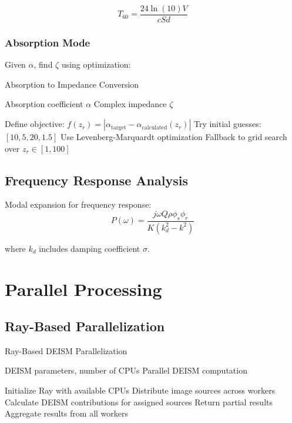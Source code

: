 \documentclass[11pt,a4paper]{article}
\begin{document}
\begin{equation}
T_{60} = \frac{24 \ln(10) V}{c S d}
\end{equation}

\subsubsection{Absorption Mode}
Given $\alpha$, find $\zeta$ using optimization:
\begin{algorithm}[H]
\caption{Absorption to Impedance Conversion}
\begin{algorithmic}[1]
\Require Absorption coefficient $\alpha$
\Ensure Complex impedance $\zeta$

\State Define objective: $f(z_r) = |\alpha_{\text{target}} - \alpha_{\text{calculated}}(z_r)|$
\State Try initial guesses: $[10, 5, 20, 1.5]$
\State Use Levenberg-Marquardt optimization
    \State Fallback to grid search over $z_r \in [1, 100]$
\EndIf
\end{algorithmic}
\end{algorithm}

\subsection{Frequency Response Analysis}

Modal expansion for frequency response:
\begin{equation}
P(\omega) = \frac{j\omega Q \rho \phi_s \phi_r}{K(k_d^2 - k^2)}
\end{equation}

where $k_d$ includes damping coefficient $\sigma$.

\section{Parallel Processing}

\subsection{Ray-Based Parallelization}

\begin{algorithm}[H]
\caption{Ray-Based DEISM Parallelization}
\begin{algorithmic}[1]
\Require DEISM parameters, number of CPUs
\Ensure Parallel DEISM computation

\State Initialize Ray with available CPUs
\State Distribute image sources across workers
    \State Calculate DEISM contributions for assigned sources
    \State Return partial results
\EndFor
\State Aggregate results from all workers
\end{algorithmic}
\end{algorithm}
\end{document}
